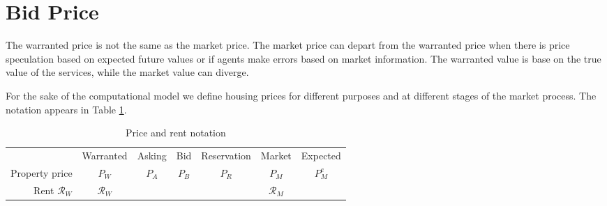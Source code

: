 


\section{Bid Price}

The warranted price  is not the same as the market price. The market price can depart from the warranted price when there is price speculation based on expected future values or if agents make errors based on market information.
The warranted value is base on the true value of the services, while the market value can diverge. 

For the sake of the computational model we define housing prices for different purposes and at different stages of the market process. The notation appears in Table \ref{table-price-notation}.

\begin{table}[]
\centering
\begin{tabular}{r|c|c|c|c|c|c|}\cline{2-7}
                     & Warranted       & Asking  & Bid  & Reservation & Market          & Expected \\ \cline{2-7}
Property price       & $P_W$           & $P_A$  & $P_B$ & $P_R$       & $P_M$           & $P_M^e$  \\ \cline{2-7}
Rent $\mathcal{R}_W$ & $\mathcal{R}_W$ &        &       &             & $\mathcal{R}_M$ &          \\ \cline{2-7}
\end{tabular}
\caption{Price and rent notation}
\label{table-price-notation}
\end{table}


